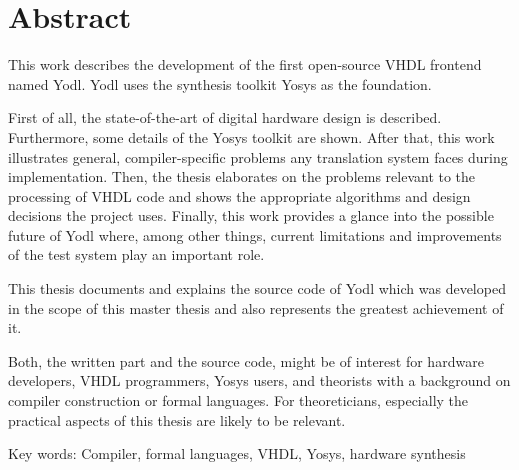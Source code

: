 \chapter*{Abstract}
\thispagestyle{empty}
This work describes the development of the first open-source VHDL
frontend named Yodl. Yodl uses the synthesis toolkit Yosys as the
foundation.

First of all, the state-of-the-art of digital hardware design is
described. Furthermore, some details of the Yosys toolkit are
shown. After that, this work illustrates general, compiler-specific
problems any translation system faces during implementation. Then, the
thesis elaborates on the problems relevant to the processing of VHDL
code and shows the appropriate algorithms and design decisions the
project uses. Finally, this work provides a glance into the possible
future of Yodl where, among other things, current limitations and
improvements of the test system play an important role.

This thesis documents and explains the source code of Yodl which was
developed in the scope of this master thesis and also represents the
greatest achievement of it.

Both, the written part and the source code, might be of interest for
hardware developers, VHDL programmers, Yosys users, and theorists with
a background on compiler construction or formal languages. For
theoreticians, especially the practical aspects of this thesis are
likely to be relevant.

\bigskip

\noindent
Key words: Compiler, formal languages, VHDL, Yosys, hardware synthesis
